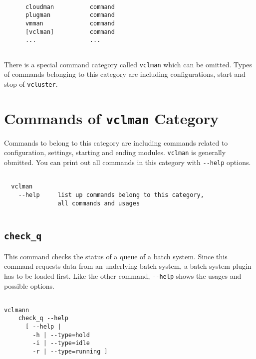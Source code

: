 \documentclass[11pt]{article}
\def \ttt{\texttt}
\def \vb{\verb}
\begin{document}
\begin{Verbatim}[fontfamily=courier, fontsize = \small, obeytabs
=true, tabsize=4, frame=lines]

      cloudman          command
      plugman           command
      vmman             command
      [vclman]          command
      ...               ...
  
\end{Verbatim}

There is a special command category called \vb+vclman+ which can be omitted. Types of commands belonging to this category are including configurations, start and stop of \vb+vcluster+.

\newpage

\section{Commands of \ttt{vclman} Category}

Commands to belong to this category are including commands related to configuration, settings, starting and ending modules. \vb+vclman+ is generally obmitted. You can print out all commands in this category with \vb+--help+ options. 


\begin{Verbatim}[fontfamily=courier, fontsize = \small, obeytabs
=true, tabsize=4, frame=lines]

  vclman 
    --help     list up commands belong to this category, 
               all commands and usages
  
\end{Verbatim}


\subsection{\ttt{check\_q}}
This command checks the status of a queue of a batch system. Since this command requests data from an underlying batch system, a batch system plugin has to be loaded first. Like the other command, \vb+--help+ shows the usages and possible options.

\begin{Verbatim}[fontfamily=courier, fontsize = \small, obeytabs
=true, tabsize=4, frame=lines]

vclmann 
    check_q --help
      [ --help |
        -h | --type=hold
        -i | --type=idle
        -r | --type=running ] 
      
\end{Verbatim}
\end{document}

